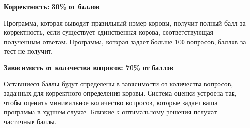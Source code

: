 \textbf{Корректность: 30\% от баллов}

Программа, которая выводит правильный номер коровы, получит полный балл за
корректность, если существует единственная корова, соответствующая
полученным ответам. Программа, которая задает больше 100 вопросов, баллов за
тест не получит. 

\textbf{Зависимость от количества вопросов: 70\% от баллов}

Оставшиеся баллы будут определены в зависимости от количества вопросов,
заданных для корректного определения коровы. Система оценки устроена так,
чтобы оценить минимальное количество вопросов, которые задает ваша программа
в худшем случае. Близкие к оптимальному решения получат частичные баллы. 